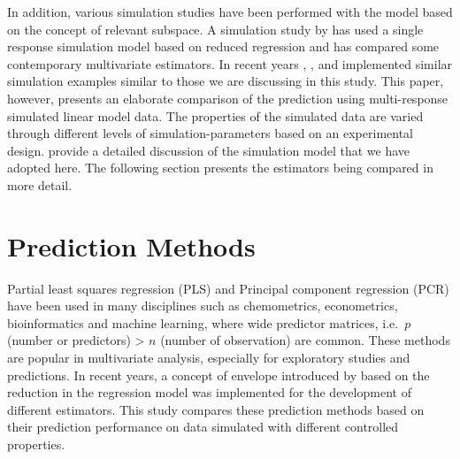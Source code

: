 \documentclass[review]{elsarticle}
\begin{document}
In addition, various simulation studies have been performed with the model based on the concept of relevant subspace. A simulation study by \citet{Alm_y_1996} has used a single response simulation model based on reduced regression and has compared some contemporary multivariate estimators. In recent years \citet{helland2012near}, \citet{saebo2015simrel}, \citet{helland2016algorithms} and \citet{Rimal2018} implemented similar simulation examples similar to those we are discussing in this study. This paper, however, presents an elaborate comparison of the prediction using multi-response simulated linear model data. The properties of the simulated data are varied through different levels of simulation-parameters based on an experimental design. \citet{Rimal2018} provide a detailed discussion of the simulation model that we have adopted here. The following section presents the estimators being compared in more detail.

\hypertarget{prediction-methods}{%
\section{Prediction Methods}\label{prediction-methods}}

Partial least squares regression (PLS) and Principal component regression (PCR) have been used in many disciplines such as chemometrics, econometrics, bioinformatics and machine learning, where wide predictor matrices, i.e.~\(p\) (number or predictors) \textgreater{} \(n\) (number of observation) are common. These methods are popular in multivariate analysis, especially for exploratory studies and predictions. In recent years, a concept of envelope introduced by \citet{Cook2007a} based on the reduction in the regression model was implemented for the development of different estimators. This study compares these prediction methods based on their prediction performance on data simulated with different controlled properties.
\end{document}
